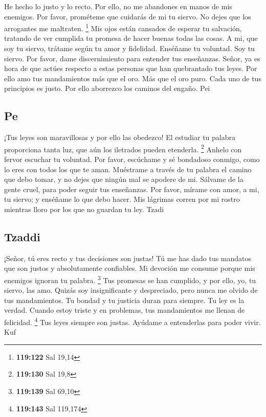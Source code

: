  He hecho lo justo y lo recto. Por ello, no me abandones
en manos de mis enemigos.  Por favor, prométeme que
cuidarás de mi tu siervo. No dejes que los arrogantes me maltraten.
\footnote{\textbf{119:122} Sal 19,14}  Mis ojos están
cansados de esperar tu salvación, tratando de ver cumplida tu promesa de
hacer buenas todas las cosas.  A mi, que soy tu siervo,
trátame según tu amor y fidelidad. Enséñame tu voluntad. 
Soy tu siervo. Por favor, dame discernimiento para entender tus
enseñanzas.  Señor, ya es hora de que actúes respecto a
estas personas que han quebrantado tus leyes.  Por ello
amo tus mandamientos más que el oro. Más que el oro puro. 
Cada uno de tus principios es justo. Por ello aborrezco los caminos del
engaño. Pei

\hypertarget{pe}{%
\subsection{Pe}\label{pe}}

 ¡Tus leyes son maravillosas y por ello las obedezco!
 El estudiar tu palabra proporciona tanta luz, que aún los
iletrados pueden etenderla. \footnote{\textbf{119:130} Sal 19,8}
 Anhelo con fervor escuchar tu voluntad. 
Por favor, escúchame y sé bondadoso conmigo, como lo eres con todos los
que te aman.  Muéstrame a través de tu palabra el camino
que debo tomar, y no dejes que ningún mal se apodere de mi.
 Sálvame de la gente cruel, para poder seguir tus
enseñanzas.  Por favor, mírame con amor, a mi, tu siervo;
y enséñame lo que debo hacer.  Mis lágrimas corren por mi
rostro mientras lloro por los que no guardan tu ley. Tzadi

\hypertarget{tzaddi}{%
\subsection{Tzaddi}\label{tzaddi}}

 ¡Señor, tú eres recto y tus decisiones son justas!
 Tú me has dado tus mandatos que son justos y
absolutamente confiables.  Mi devoción me consume porque
mis enemigos ignoran tu palabra. \footnote{\textbf{119:139} Sal 69,10}
 Tus promesas se han cumplido, y por ello, yo, tu siervo,
las amo.  Quizás soy insignificante y despreciado, pero
nunca me olvido de tus mandamientos.  Tu bondad y tu
justicia duran para siempre. Tu ley es la verdad.  Cuando
estoy triste y en problemas, tus mandamientos me llenan de felicidad.
\footnote{\textbf{119:143} Sal 119,174}  Tus leyes siempre
son justas. Ayúdame a entenderlas para poder vivir. Kuf

